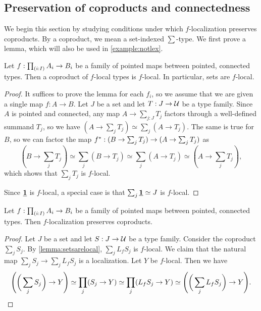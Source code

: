 \subsection{Preservation of coproducts and connectedness}\label{ss:connectedness}

We begin this section by studying conditions under which
$f$-localization preserves coproducts. 
By a coproduct, we mean a set-indexed $\sum$-type.
We first prove a lemma, which will also be used in \cref{example:notlex}.

\begin{lem}\label{lemma:setsarelocal}
    Let $f : \prd{i:I} A_i \to B_i$ be a family of pointed maps
    between pointed, connected types.
    Then a coproduct of $f$-local types is $f$-local.
    In particular, sets are $f$-local.
\end{lem}

\begin{proof}
    It suffices to prove the lemma for each $f_i$, so we assume
    that we are given a single map $f : A \to B$.
    Let $J$ be a set and let $T : J \to \mathcal{U}$ be a type family.
    Since $A$ is pointed and connected, any map $A \to \sum_{j:J} T_j$ factors through a well-defined summand
    $T_j$, so we have $(A \to \sum_j T_j) \simeq \sum_j (A \to T_j)$. The same is true for $B$, so
    we can factor the map ${f}^\ast : (B \to \sum_j T_j) \to (A \to \sum_j T_j)$ as
    \[
        \left(B \to \sum_j T_j \right) \simeq \sum_j (B \to T_j) \simeq \sum_j (A \to T_j) \simeq \left(A \to \sum_j T_j\right),
    \]
    which shows that $\sum_j T_j$ is $f$-local.

    Since $\underline{\mathbf{1}}$ is $f$-local, a special case is that $\sum_j \underline{\mathbf{1}} \simeq J$ is $f$-local.
\end{proof}

\begin{cor}
    Let $f : \prd{i:I} A_i \to B_i$ be a family of pointed maps
    between pointed, connected types.
    Then $f$-localization preserves coproducts.
\end{cor}

\begin{proof}
    Let $J$ be a set and let $S : J \to \mathcal{U}$ be a type family.
    Consider the coproduct $\sum_j S_j$.
    By \cref{lemma:setsarelocal}, $\sum_j L_f S_j$ is $f$-local. We claim that the natural
    map $\sum_j S_j \to \sum_j L_f S_j$ is a localization.
    Let $Y$ be $f$-local. Then we have
    \[
        \Bigg( \bigg( \sum_j S_j \bigg) \to Y \Bigg) \simeq \prod_j (S_j \to Y) \simeq
        \prod_j (L_f S_j \to Y) \simeq \Bigg( \bigg( \sum_j L_f S_j \bigg) \to Y \Bigg).\qedhere
    \]
\end{proof}

